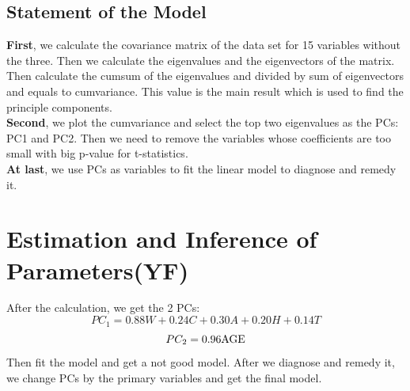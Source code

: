 \documentclass[12pt]{article}
\begin{document}
\subsection{\sffamily Statement of the Model}
\textbf{First}, we calculate the covariance matrix of the data set for 15 variables without the three.
Then we calculate the eigenvalues and the eigenvectors of the matrix.
Then calculate the cumsum of the eigenvalues and divided by sum of eigenvectors and equals to cumvariance. 
This value is the main result which is used to find the principle components.\\
\textbf{Second}, we plot the cumvariance and select the top two eigenvalues as the PCs: PC1 and PC2.
Then we need to remove the variables whose coefficients are too small with big p-value for t-statistics.\\
\textbf{At last}, we use PCs as variables to fit the linear model to diagnose and remedy it.


\vspace{-1em}
\section{\sffamily Estimation and Inference of Parameters(YF)}
After the calculation, we get the 2 PCs:
$$PC_1 = 0.88W + 0.24 C + 0.30
A + 0.20  H + 0.14 T$$
$$PC_2 = 0.96{\rm AGE} $$
Then fit the model and get a not good model. 
After we diagnose and remedy it, we change PCs by the primary variables and get the final model.
\vspace{-1em}
\end{document}
